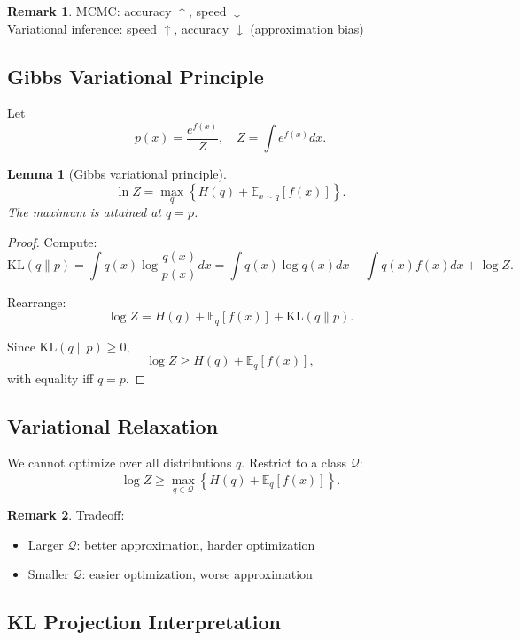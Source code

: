 \documentclass[12pt,oneside]{book}
\numberwithin{equation}{section}
\theoremstyle{definition}
\newtheorem{remark}{Remark}[section]
\theoremstyle{plain}
\newtheorem{lemma}{Lemma}[section]
\theoremstyle{remark}
\newcommand{\E}{\mathbb{E}}
\begin{document}
\begin{remark}
MCMC: accuracy $\uparrow$, speed $\downarrow$ \\
Variational inference: speed $\uparrow$, accuracy $\downarrow$ (approximation bias)
\end{remark}

\subsection{Gibbs Variational Principle}

Let
\[
p(x) = \frac{e^{f(x)}}{Z}, \quad Z = \int e^{f(x)} dx.
\]

\begin{lemma}[Gibbs variational principle]
\[
\ln Z = \max_{q} \left\{ H(q) + \E_{x \sim q}[f(x)] \right\}.
\]
The maximum is attained at $q = p$.
\end{lemma}

\begin{proof}
Compute:
\[
\mathrm{KL}(q \| p)
=
\int q(x) \log \frac{q(x)}{p(x)} dx
=
\int q(x)\log q(x) dx - \int q(x) f(x) dx + \log Z.
\]

Rearrange:
\[
\log Z = H(q) + \E_q[f(x)] + \mathrm{KL}(q \| p).
\]

Since $\mathrm{KL}(q \| p) \ge 0$,
\[
\log Z \ge H(q) + \E_q[f(x)],
\]
with equality iff $q = p$.
\end{proof}

\subsection{Variational Relaxation}

We cannot optimize over all distributions $q$. Restrict to a class $\mathcal{Q}$:
\[
\log Z \ge \max_{q \in \mathcal{Q}} \left\{ H(q) + \E_q[f(x)] \right\}.
\]

\begin{remark}
Tradeoff:
\begin{itemize}
    \item Larger $\mathcal{Q}$: better approximation, harder optimization
    \item Smaller $\mathcal{Q}$: easier optimization, worse approximation
\end{itemize}
\end{remark}

\subsection{KL Projection Interpretation}
\end{document}
